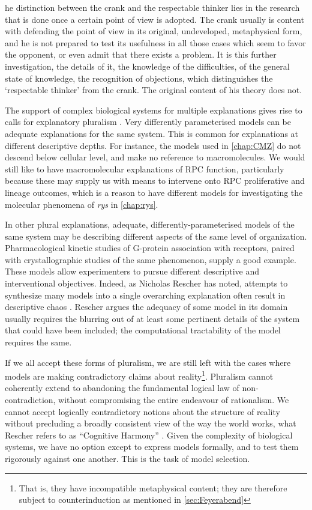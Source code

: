 \documentclass{ut-thesis}
\begin{document}
\begin{NoHyper}
\begin{longquote}
[T]he distinction between the crank and the respectable thinker lies in the research that is done once a certain point of view is adopted. The crank usually is content with defending the point of view in its original, undeveloped, metaphysical form, and he is not prepared to test its usefulness in all those cases which seem to favor the opponent, or even admit that there exists a problem. It is this further investigation, the details of it, the knowledge of the difficulties, of the general state of knowledge, the recognition of objections, which distinguishes the ‘respectable thinker’ from the crank. The original content of his theory does not.
\cite[p.199]{Feyerabend1981}
\end{longquote}

The support of complex biological systems for multiple explanations gives rise to calls for explanatory pluralism \cite{Brigandt2010}. Very differently parameterised models can be adequate explanations for the same system. This is common for explanations at different descriptive depths. For instance, the models used in \autoref{chap:CMZ} do not descend below cellular level, and make no reference to macromolecules. We would still like to have macromolecular explanations of RPC function, particularly because these may supply us with means to intervene onto RPC proliferative and lineage outcomes, which is a reason to have different models for investigating the molecular phenomena of \textit{rys} in \autoref{chap:rys}.

In other plural explanations, adequate, differently-parameterised models of the same system may be describing different aspects of the same level of organization. Pharmacological kinetic studies of G-protein association with receptors, paired with crystallographic studies of the same phenomenon, supply a good example. These models allow experimenters to pursue different descriptive and interventional objectives. Indeed, as Nicholas Rescher has noted, attempts to synthesize many models into a single overarching explanation often result in descriptive chaos \cite[p.65-6]{Rescher2000}. Rescher argues the adequacy of some model in its domain usually requires the blurring out of at least some pertinent details of the system that could have been included; the computational tractability of the model requires the same.

If we all accept these forms of pluralism, we are still left with the cases where models are making contradictory claims about reality\footnote{That is, they have incompatible metaphysical content; they are therefore subject to counterinduction as mentioned in \autoref{sec:Feyerabend}}. Pluralism cannot coherently extend to abandoning the fundamental logical law of non-contradiction, without compromising the entire endeavour of rationalism. We cannot accept logically contradictory notions about the structure of reality without precluding a broadly consistent view of the way the world works, what Rescher refers to as ``Cognitive Harmony'' \cite{Rescher2005}. Given the complexity of biological systems, we have no option except to express models formally, and to test them rigorously against one another. This is the task of model selection.


\end{NoHyper}
\end{document}
